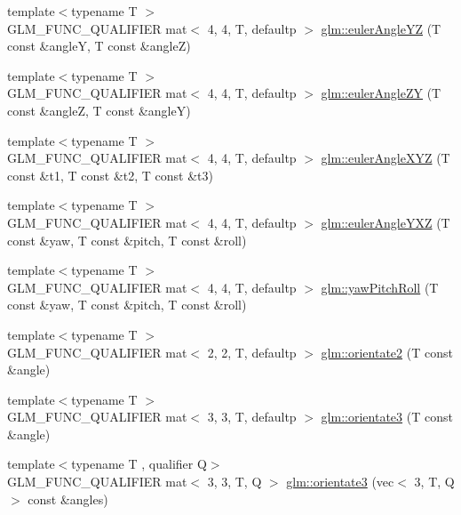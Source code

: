 \begin{DoxyCompactItemize}
\item 
{\footnotesize template$<$typename T $>$ }\\G\+L\+M\+\_\+\+F\+U\+N\+C\+\_\+\+Q\+U\+A\+L\+I\+F\+I\+ER mat$<$ 4, 4, T, defaultp $>$ \hyperlink{group__gtx__euler__angles_ga220379e10ac8cca55e275f0c9018fed9}{glm\+::euler\+Angle\+YZ} (T const \&angleY, T const \&angleZ)
\item 
{\footnotesize template$<$typename T $>$ }\\G\+L\+M\+\_\+\+F\+U\+N\+C\+\_\+\+Q\+U\+A\+L\+I\+F\+I\+ER mat$<$ 4, 4, T, defaultp $>$ \hyperlink{group__gtx__euler__angles_ga400b2bd5984999efab663f3a68e1d020}{glm\+::euler\+Angle\+ZY} (T const \&angleZ, T const \&angleY)
\item 
{\footnotesize template$<$typename T $>$ }\\G\+L\+M\+\_\+\+F\+U\+N\+C\+\_\+\+Q\+U\+A\+L\+I\+F\+I\+ER mat$<$ 4, 4, T, defaultp $>$ \hyperlink{group__gtx__euler__angles_ga1975e0f0e9bed7f716dc9946da2ab645}{glm\+::euler\+Angle\+X\+YZ} (T const \&t1, T const \&t2, T const \&t3)
\item 
{\footnotesize template$<$typename T $>$ }\\G\+L\+M\+\_\+\+F\+U\+N\+C\+\_\+\+Q\+U\+A\+L\+I\+F\+I\+ER mat$<$ 4, 4, T, defaultp $>$ \hyperlink{group__gtx__euler__angles_gab8ba99a9814f6d9edf417b6c6d5b0c10}{glm\+::euler\+Angle\+Y\+XZ} (T const \&yaw, T const \&pitch, T const \&roll)
\item 
{\footnotesize template$<$typename T $>$ }\\G\+L\+M\+\_\+\+F\+U\+N\+C\+\_\+\+Q\+U\+A\+L\+I\+F\+I\+ER mat$<$ 4, 4, T, defaultp $>$ \hyperlink{group__gtx__euler__angles_gae6aa26ccb020d281b449619e419a609e}{glm\+::yaw\+Pitch\+Roll} (T const \&yaw, T const \&pitch, T const \&roll)
\item 
{\footnotesize template$<$typename T $>$ }\\G\+L\+M\+\_\+\+F\+U\+N\+C\+\_\+\+Q\+U\+A\+L\+I\+F\+I\+ER mat$<$ 2, 2, T, defaultp $>$ \hyperlink{group__gtx__euler__angles_gae16738a9f1887cf4e4db6a124637608d}{glm\+::orientate2} (T const \&angle)
\item 
{\footnotesize template$<$typename T $>$ }\\G\+L\+M\+\_\+\+F\+U\+N\+C\+\_\+\+Q\+U\+A\+L\+I\+F\+I\+ER mat$<$ 3, 3, T, defaultp $>$ \hyperlink{group__gtx__euler__angles_ga7ca98668a5786f19c7b38299ebbc9b4c}{glm\+::orientate3} (T const \&angle)
\item 
{\footnotesize template$<$typename T , qualifier Q$>$ }\\G\+L\+M\+\_\+\+F\+U\+N\+C\+\_\+\+Q\+U\+A\+L\+I\+F\+I\+ER mat$<$ 3, 3, T, Q $>$ \hyperlink{group__gtx__euler__angles_ga7238c8e15c7720e3ca6a45ab151eeabb}{glm\+::orientate3} (vec$<$ 3, T, Q $>$ const \&angles)

\end{DoxyCompactItemize}
